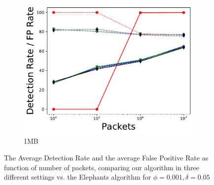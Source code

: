 \begin{figure}[p]
\begin{subfigure}[t]{0.32\textwidth}
    \includegraphics[width=\linewidth]{figures/DR_FPR_per_pkts_m=1.0.pdf}
    \caption{1MB}
    \label{fig:fig2_f}
\end{subfigure}

\caption{The Average Detection Rate and the average False Positive Rate as function of number of packets, comparing our algorithm in three different settings vs. the Elephants algorithm for $\phi=0.001,\delta=0.05$}
\label{figure2+3}
\vspace*{-0.2cm}
\end{figure}
